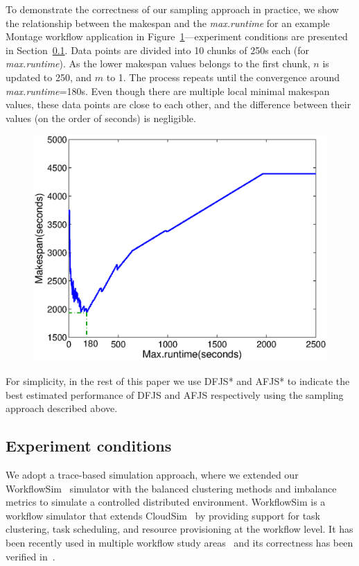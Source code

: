 
To demonstrate the correctness of our sampling approach in practice, we show the relationship between the makespan and the \emph{max.runtime} for an example Montage workflow application in Figure~\ref{fig:evaluation_dfjs_montage}---experiment conditions are presented in Section~\ref{sec:experiment_conditions}. Data points are divided into 10 chunks of 250s each (for \emph{max.runtime}). As the lower makespan values belongs to the first chunk, $n$ is updated to 250, and $m$ to 1. The process repeats until the convergence around \emph{max.runtime}=180s. Even though there are multiple local minimal makespan values, these data points are close to each other, and the difference between their values (on the order of seconds) is negligible.

\begin{figure}[!htb]
	\centering
	\includegraphics[width=.9\linewidth]{figure19.eps}
	\label{fig:evaluation_dfjs_montage}
\end{figure}

For simplicity, in the rest of this paper we use DFJS* and AFJS* to indicate the best estimated performance of DFJS and AFJS respectively using the sampling approach described above.


\subsection{Experiment conditions}
\label{sec:experiment_conditions}
We adopt a trace-based simulation approach, where we extended our WorkflowSim~\cite{Chen2012a} simulator with the balanced clustering methods and imbalance metrics to simulate a controlled distributed environment. WorkflowSim is a workflow simulator that extends CloudSim~\cite{Calheiros2011} by providing support for task clustering, task scheduling, and resource provisioning at the workflow level. It has been recently used in multiple workflow study areas~\cite{6683907,Chen2012, jrad2013broker} and its correctness has been verified in~\cite{Chen2012a}. 

